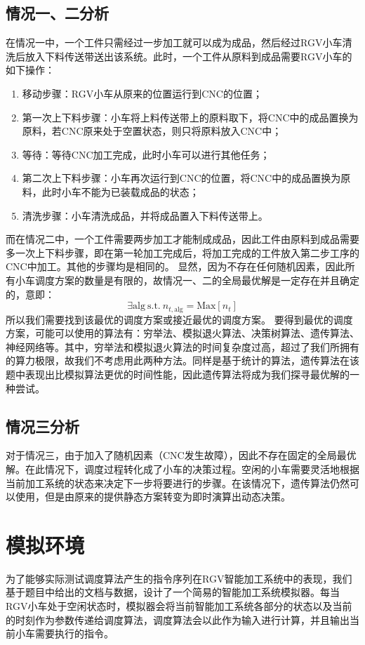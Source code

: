 \documentclass{cumcmthesis}
\begin{document}
	\subsection{情况一、二分析}
	在情况一中，一个工件只需经过一步加工就可以成为成品，然后经过RGV小车清洗后放入下料传送带送出该系统。此时，一个工件从原料到成品需要RGV小车的如下操作：
	\begin{enumerate}
		\item 移动步骤：RGV小车从原来的位置运行到CNC的位置；
		\item 第一次上下料步骤：小车将上料传送带上的原料取下，将CNC中的成品置换为原料，若CNC原来处于空置状态，则只将原料放入CNC中；
		\item 等待：等待CNC加工完成，此时小车可以进行其他任务；
		\item 第二次上下料步骤：小车再次运行到CNC的位置，将CNC中的成品置换为原料，此时小车不能为已装载成品的状态；
		\item 清洗步骤：小车清洗成品，并将成品置入下料传送带上。
	\end{enumerate}
	而在情况二中，一个工件需要两步加工才能制成成品，因此工件由原料到成品需要多一次上下料步骤，即在第一轮加工完成后，将加工完成的工件放入第二步工序的CNC中加工。其他的步骤均是相同的。\newline
	显然，因为不存在任何随机因素，因此所有小车调度方案的数量是有限的，故情况一、二的全局最优解是一定存在并且确定的，意即：
	\[\exists\textrm{alg}\ \textrm{s.t.}\ n_{t, \textrm{alg}}=\textrm{Max}[n_t]\]
	所以我们需要找到该最优的调度方案或接近最优的调度方案。\newline
	要得到最优的调度方案，可能可以使用的算法有：穷举法、模拟退火算法、决策树算法、遗传算法、神经网络等。其中，穷举法和模拟退火算法的时间复杂度过高，超过了我们所拥有的算力极限，故我们不考虑用此两种方法。同样是基于统计的算法，遗传算法在该题中表现出比模拟算法更优的时间性能，因此遗传算法将成为我们探寻最优解的一种尝试。
	
	\subsection{情况三分析}
	对于情况三，由于加入了随机因素（CNC发生故障），因此不存在固定的全局最优解。在此情况下，调度过程转化成了小车的决策过程。空闲的小车需要灵活地根据当前加工系统的状态来决定下一步将要进行的步骤。在该情况下，遗传算法仍然可以使用，但是由原来的提供静态方案转变为即时演算出动态决策。
	
	\section{模拟环境}
	为了能够实际测试调度算法产生的指令序列在RGV智能加工系统中的表现，我们基于题目中给出的文档与数据，设计了一个简易的智能加工系统模拟器。每当RGV小车处于空闲状态时，模拟器会将当前智能加工系统各部分的状态以及当前的时刻作为参数传递给调度算法，调度算法会以此作为输入进行计算，并且输出当前小车需要执行的指令。
	
\end{document}
